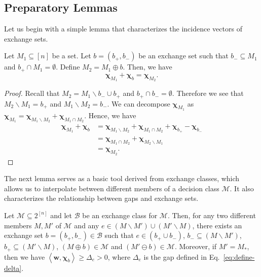 \documentclass{article}
\newcommand{\M}{\mathcal M}
\newcommand{\B}{\mathcal B}
\newcommand{\del}{\backslash}
\DeclareMathOperator{\rad}{rad}
\newcommand{\inn}[1]{\left\langle #1 \right\rangle}
\renewcommand{\vec}[1]{\boldsymbol{#1}}
\begin{document}
\subsection{Preparatory Lemmas}
Let us begin with a simple lemma that characterizes the incidence vectors of exchange sets.
\begin{lemma}
Let $M_1 \subseteq [n]$ be a set.
Let $b=(b_+,b_-)$ be an exchange set such that 
$b_-\subseteq M_1$ and $b_+ \cap M_1 = \emptyset$.
Define $M_2 = M_1 \oplus b$.
Then, we have 
$$
\vec\chi_{M_1} +\vec\chi_{b} = \vec\chi_{M_2}.
$$
\label{lemma:exchange-char}
\end{lemma}

\begin{proof}
Recall that $M_2 = M_1 \del b_- \cup b_+$ and $b_+\cap b_-=\emptyset$.
Therefore we see that $M_2 \del M_1 = b_+$ and $M_1 \del M_2 = b_-$.
We can decompose $\vec\chi_{M_1}$ as $\vec\chi_{M_1}=\vec\chi_{M_1\del M_2}+\vec\chi_{M_1\cap M_2}$.
Hence, we have
\begin{align*}
   \vec\chi_{M_1}+\vec\chi_{b} &= \vec\chi_{M_1\del M_2}+\vec\chi_{M_1\cap M_2} + \vec\chi_{b_+}-\vec\chi_{b_-}\\
   							   &= \vec\chi_{M_1\cap M_2} + \vec\chi_{M_2\del M_1}\\
   							   &= \vec\chi_{M_2}.
\end{align*}
\end{proof}

The next lemma serves as a basic tool derived from exchange classes, which allows us to interpolate between different members of a decision class $\M$.
It also characterizes the relationship between gaps and exchange sets.
\begin{lemma}
\label{lemma:exchange}
Let $\M\subseteq 2^{[n]}$ and let $\B$ be an exchange class for $\M$.
Then, for any two different members $M,M'$ of $\M$ and any $e \in (M\del M')\cup(M'\del M)$, there exists an exchange set $b=(b_+,b_-) \in \B$ such that
$e\in (b_+\cup b_-)$, $b_-\subseteq (M\del M')$, $b_+\subseteq (M'\del M)$, 
$(M\oplus b) \in \M$ and  $(M'\ominus b) \in \M$.
Moreover, if $M' = M_*$, then we have $\inn{\vec w, \vec \chi_b} \ge \Delta_e > 0$,
where $\Delta_e$ is the gap defined in Eq.~\eqref{eq:define-delta}.
\end{lemma}
\end{document}
